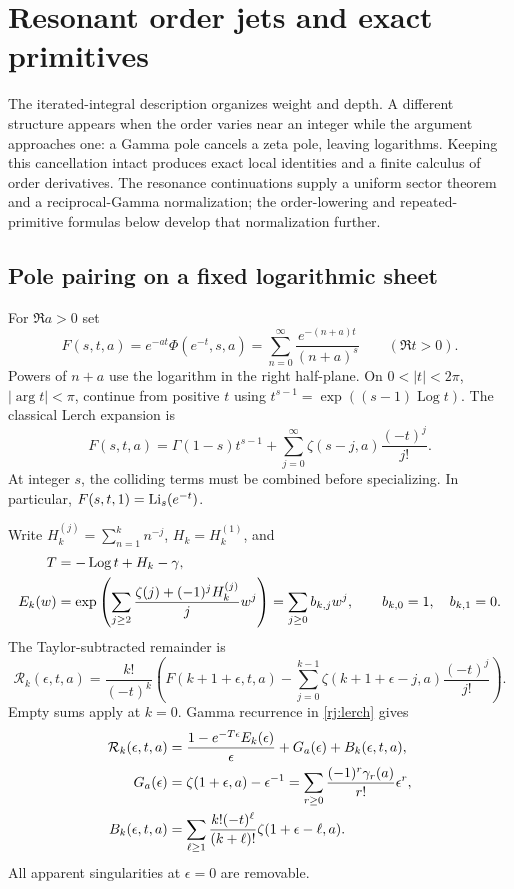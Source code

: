 \section{Resonant order jets and exact primitives}\label{rj:section}

The iterated-integral description organizes weight and depth. A different
structure appears when the order varies near an integer while the argument
approaches one: a Gamma pole cancels a zeta pole, leaving logarithms.
Keeping this cancellation intact produces exact local identities and a
finite calculus of order derivatives. The resonance continuations
\cite{rj:reports} supply a uniform sector theorem and a reciprocal-Gamma
normalization; the order-lowering and repeated-primitive formulas below
develop that normalization further.

\subsection{Pole pairing on a fixed logarithmic sheet}
For $\Re a>0$ set
\[
 F(s,t,a)=e^{-at}\Phi(e^{-t},s,a)
       =\sum_{n=0}^{\infty}\frac{e^{-(n+a)t}}{(n+a)^s}
       \qquad(\Re t>0).
\]
Powers of $n+a$ use the logarithm in the right half-plane. On
$0<|t|<2\pi$, $|\arg t|<\pi$, continue from positive $t$ using
$t^{s-1}=\exp((s-1)\operatorname{Log}t)$. The classical Lerch expansion
\cite{tw:DLMFLerch} is
\begin{equation}\label{rj:lerch}
 F(s,t,a)=\Gamma(1-s)t^{s-1}
       +\sum_{j=0}^{\infty}\zeta(s-j,a)\frac{(-t)^j}{j!}.
\end{equation}
At integer $s$, the colliding terms must be combined before specializing.
In particular, $F(s,t,1)=\operatorname{Li}_s(e^{-t})$.

Write $H_k^{(j)}=\sum_{n=1}^k n^{-j}$, $H_k=H_k^{(1)}$, and
\begin{align}
 T&=-\operatorname{Log}t+H_k-\gamma,\notag\\
 E_k(w)&=\exp\left(\sum_{j\ge2}
       \frac{\zeta(j)+(-1)^jH_k^{(j)}}j w^j\right)
       =\sum_{j\ge0}b_{k,j}w^j,\qquad b_{k,0}=1,\quad b_{k,1}=0.
       \label{rj:center}
\end{align}
The Taylor-subtracted remainder is
\[
 \mathcal R_k(\epsilon,t,a)=\frac{k!}{(-t)^k}
 \left(F(k+1+\epsilon,t,a)
 -\sum_{j=0}^{k-1}\zeta(k+1+\epsilon-j,a)\frac{(-t)^j}{j!}\right).
\]
Empty sums apply at $k=0$. Gamma recurrence in \eqref{rj:lerch} gives
\begin{align}
 \mathcal R_k(\epsilon,t,a)
 &=\frac{1-e^{-T\epsilon}E_k(\epsilon)}{\epsilon}
       +G_a(\epsilon)+B_k(\epsilon,t,a),\label{rj:paired}\\
 G_a(\epsilon)&=\zeta(1+\epsilon,a)-\epsilon^{-1}
       =\sum_{r\ge0}\frac{(-1)^r\gamma_r(a)}{r!}\epsilon^r,\notag\\
 B_k(\epsilon,t,a)&=\sum_{\ell\ge1}
       \frac{k!(-t)^\ell}{(k+\ell)!}\zeta(1+\epsilon-\ell,a).\notag
\end{align}
All apparent singularities at $\epsilon=0$ are removable.

